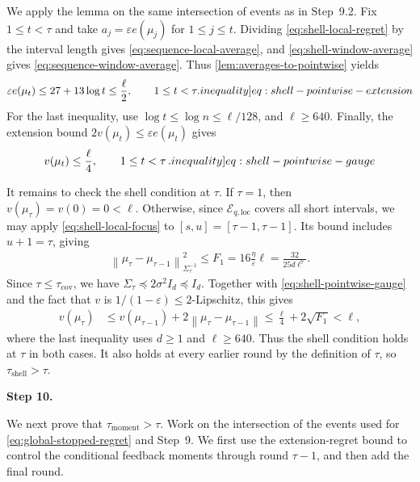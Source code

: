 \documentclass[12pt,cleveref]{jmlr}
\newcommand{\ineqlabel}[1]{\label[inequality]{#1}}
\newcommand{\proofstepinline}[1]{%
    \par\addvspace{0.6\baselineskip}
    \noindent
    {\normalfont\normalsize\bfseries\color{blue!55!black}Step #1.}\enspace\ignorespaces
}
\newcommand{\1}{\mathbf 1}
\newcommand{\eps}{\varepsilon}
\newcommand{\norm}[1]{\left\lVert #1\right\rVert}
\newcommand{\normm}[2]{\left\lVert #1\right\rVert_{#2}}
\begin{document}
We apply the lemma on the same intersection of events as in Step~9.2.
Fix $1\leq t<\tau$ and take $a_j=\eps e(\mu_j)$ for $1\leq j\leq t$.
Dividing \cref{eq:shell-local-regret} by the interval length gives
\cref{eq:sequence-local-average}, and \cref{eq:shell-window-average}
gives \cref{eq:sequence-window-average}.
Thus \cref{lem:averages-to-pointwise} yields
\begin{align}
    \eps e(\mu_t)
    \leq27+13\log t
    \leq\frac\ell2,
    \qquad 1\leq t<\tau.
    \ineqlabel{eq:shell-pointwise-extension}
\end{align}
For the last inequality, use $\log t\leq\log n\leq\ell/128$,
and $\ell\geq640$.
Finally, the extension bound $2v(\mu_t)\leq\eps e(\mu_t)$ gives
\begin{align}
    v(\mu_t)\leq\frac\ell4,
    \qquad 1\leq t<\tau\,.
    \ineqlabel{eq:shell-pointwise-gauge}
\end{align}

It remains to check the shell condition at $\tau$.
If $\tau=1$, then $v(\mu_\tau)=v(0)=0<\ell$.
Otherwise, since $\mathcal E_{q,\mathrm{loc}}$ covers all short intervals,
we may apply \cref{eq:shell-local-focus} to
$[s,u]=[\tau-1,\tau-1]$. Its bound includes $u+1=\tau$, giving
\begin{align}
    \normm{\mu_\tau-\mu_{\tau-1}}{\Sigma_\tau^{-1}}^2
    \leq F_1
    =16\frac{\eta}{\eps}\ell
    =\frac{32}{25d\ell^7}.
\end{align}
Since $\tau\leq\tau_{\mathrm{cov}}$, we have
$\Sigma_\tau\preceq2\sigma^2I_d\preceq I_d$.
Together with \cref{eq:shell-pointwise-gauge} and the fact that $v$ is
$1/(1-\eps)\leq2$-Lipschitz, this gives
\begin{align}
    v(\mu_\tau)
    & \leq v(\mu_{\tau-1})+2\norm{\mu_\tau-\mu_{\tau-1}}
    \leq\frac\ell4+2\sqrt{F_1}
    <\ell,
\end{align}
where the last inequality uses $d\geq1$ and $\ell\geq640$.
Thus the shell condition holds at $\tau$ in both cases.
It also holds at every earlier round by the definition of $\tau$,
so $\tau_{\mathrm{shell}}>\tau$.

\proofstepinline{10}
We next prove that $\tau_{\mathrm{moment}}>\tau$.
Work on the intersection of the events used for
\cref{eq:global-stopped-regret} and Step~9.
We first use the extension-regret bound to control the conditional
feedback moments through round $\tau-1$, and then add the final round.
\end{document}
